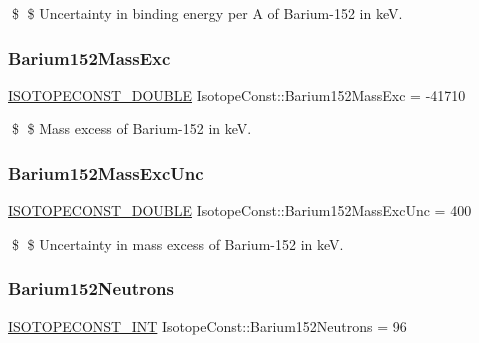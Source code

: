 \$ \$ Uncertainty in binding energy per A of Barium-\/152 in keV. \mbox{\label{group___isotope_const-_barium-_ba152_ga429d98b2ddb423c65c06ad281e46c7c0}} 
\subsubsection{\texorpdfstring{Barium152\+Mass\+Exc}{Barium152MassExc}}
{\footnotesize\ttfamily \mbox{\hyperlink{group___isotope_const-_macros_ga8f45a7272ce02c0b4c65c44636ed719a}{I\+S\+O\+T\+O\+P\+E\+C\+O\+N\+S\+T\+\_\+\+D\+O\+U\+B\+LE}} Isotope\+Const\+::\+Barium152\+Mass\+Exc = -\/41710}

\$ \$ Mass excess of Barium-\/152 in keV. \mbox{\label{group___isotope_const-_barium-_ba152_gab373bbb4f7f51b8b1563c412f63b3a2c}} 
\subsubsection{\texorpdfstring{Barium152\+Mass\+Exc\+Unc}{Barium152MassExcUnc}}
{\footnotesize\ttfamily \mbox{\hyperlink{group___isotope_const-_macros_ga8f45a7272ce02c0b4c65c44636ed719a}{I\+S\+O\+T\+O\+P\+E\+C\+O\+N\+S\+T\+\_\+\+D\+O\+U\+B\+LE}} Isotope\+Const\+::\+Barium152\+Mass\+Exc\+Unc = 400}

\$ \$ Uncertainty in mass excess of Barium-\/152 in keV. \mbox{\label{group___isotope_const-_barium-_ba152_ga29b704f28b977ee8578851160d29a26b}} 
\subsubsection{\texorpdfstring{Barium152\+Neutrons}{Barium152Neutrons}}
{\footnotesize\ttfamily \mbox{\hyperlink{group___isotope_const-_macros_ga5f18360b3e99483a35c32d789e62621c}{I\+S\+O\+T\+O\+P\+E\+C\+O\+N\+S\+T\+\_\+\+I\+NT}} Isotope\+Const\+::\+Barium152\+Neutrons = 96}

